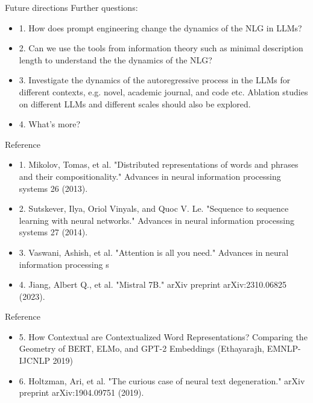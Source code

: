 \documentclass{beamer}
\begin{document}
\begin{frame}{Future directions}
	Further questions:
	\begin{itemize}
		\item 1. How does prompt engineering change the dynamics of the NLG in LLMs?
		\item 2. Can we use the tools from information theory such as minimal description length to understand the
		the dynamics of the NLG?
		\item 3. Investigate the dynamics of the autoregressive process in the LLMs for different contexts, e.g. novel, academic journal, and code etc.
		Ablation studies on different LLMs and different scales should also be explored.
		\item 4. What's more?
	\end{itemize}
\end{frame}

\begin{frame}{Reference}
	\begin{itemize}
		\item 1. Mikolov, Tomas, et al. "Distributed representations of words and phrases and their compositionality." Advances in neural information processing systems 26 (2013).
		\item 2. Sutskever, Ilya, Oriol Vinyals, and Quoc V. Le. "Sequence to sequence learning with neural networks." Advances in neural information processing systems 27 (2014).
		\item 3. Vaswani, Ashish, et al. "Attention is all you need." Advances in neural information processing s
		\item 4. Jiang, Albert Q., et al. "Mistral 7B." arXiv preprint arXiv:2310.06825 (2023).
	\end{itemize}
\end{frame}

\begin{frame}{Reference}
	\begin{itemize}
		\item 5. How Contextual are Contextualized Word Representations? Comparing the Geometry of BERT, ELMo, and GPT-2 Embeddings (Ethayarajh, EMNLP-IJCNLP 2019)
		\item 6. Holtzman, Ari, et al. "The curious case of neural text degeneration." arXiv preprint arXiv:1904.09751 (2019).
	\end{itemize}
\end{frame}
\end{document}
